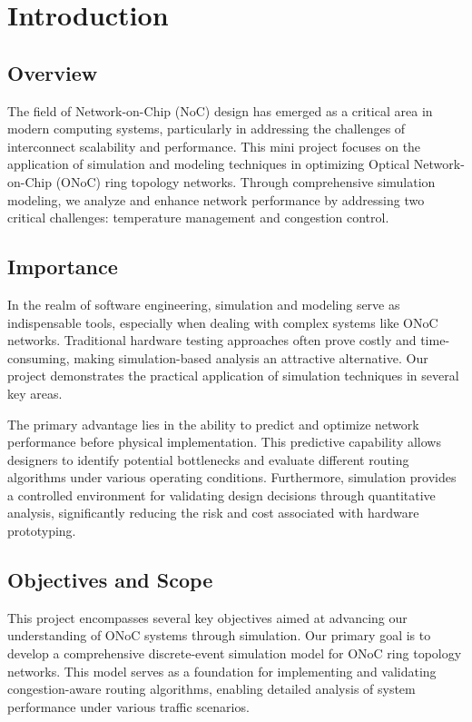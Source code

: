 \documentclass[12pt]{article}
\begin{document}
\maketitle
\thispagestyle{empty}  %

\newpage
\tableofcontents
\thispagestyle{empty}
\newpage

\setcounter{page}{1}  %

\section{Introduction}
\subsection{Overview}
The field of Network-on-Chip (NoC) design has emerged as a critical area in modern computing systems, particularly in addressing the challenges of interconnect scalability and performance. This mini project focuses on the application of simulation and modeling techniques in optimizing Optical Network-on-Chip (ONoC) ring topology networks. Through comprehensive simulation modeling, we analyze and enhance network performance by addressing two critical challenges: temperature management and congestion control.

\subsection{Importance}
In the realm of software engineering, simulation and modeling serve as indispensable tools, especially when dealing with complex systems like ONoC networks. Traditional hardware testing approaches often prove costly and time-consuming, making simulation-based analysis an attractive alternative. Our project demonstrates the practical application of simulation techniques in several key areas.

The primary advantage lies in the ability to predict and optimize network performance before physical implementation. This predictive capability allows designers to identify potential bottlenecks and evaluate different routing algorithms under various operating conditions. Furthermore, simulation provides a controlled environment for validating design decisions through quantitative analysis, significantly reducing the risk and cost associated with hardware prototyping.

\subsection{Objectives and Scope}
This project encompasses several key objectives aimed at advancing our understanding of ONoC systems through simulation. Our primary goal is to develop a comprehensive discrete-event simulation model for ONoC ring topology networks. This model serves as a foundation for implementing and validating congestion-aware routing algorithms, enabling detailed analysis of system performance under various traffic scenarios.
\end{document}

